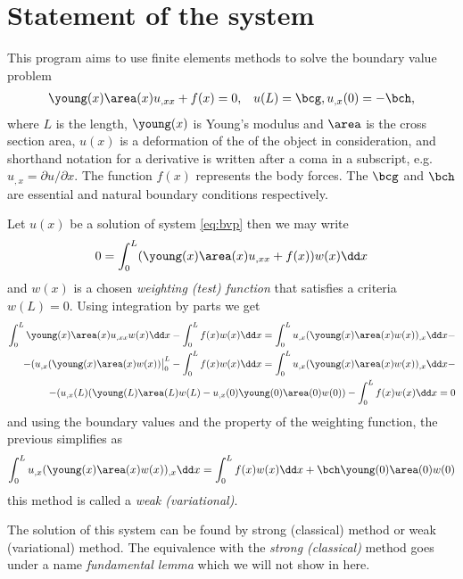 \documentclass[twoside,a4paper,12pt]{article}
\begin{document}
\section{Statement of the system}

This program aims to use finite elements methods to solve the boundary
value problem
%
\begin{align}
  \young(x) \area(x) u_{,xx} + f(x) = 0, \label{eq:bvp}
  &&u(L) = \bcg, u_{,x}(0) = -\bch,
\end{align}
where $L$ is the length, $\young(x)$ is Young's modulus and $\area$ is
the cross section area, $u(x)$ is a deformation of the of the object
in consideration, and shorthand notation for a derivative is written
after a coma in a subscript, e.g. $u_{,x} = \partial u /\partial x$.  The
function $f(x)$ represents the body forces. The $\bcg$ and $\bch$ are
essential and natural boundary conditions respectively.

Let $u(x)$ be a solution of system \eqref{eq:bvp} then we may write
%
\begin{align}
  0 = \int_0^L (\young(x) \area(x) u_{,xx} + f(x)) w(x) \dd x 
\end{align}
and $w(x)$ is a chosen \emph{weighting (test) function} that satisfies a
criteria $w(L)=0$.
%
Using integration by parts we get
%
\begin{align}
  \int_0^L \young(x) \area(x) u_{,xx} w(x) \dd x 
  -\int_0^L f(x) w(x) \dd x  =
   \int_0^L u_{,x} (\young(x) \area(x) w(x))_{,x} \dd x -\nonumber \\ -
  (u_{,x} (\young(x) \area(x)  w(x))\big|_0^L -
  \int_0^L f(x) w(x) \dd x =  
  \int_0^L u_{,x} (\young(x) \area(x) w(x))_{,x} \dd x -\nonumber \\ -
  (u_{,x}(L) (\young(L) \area(L)  w(L) -
  u_{,x}(0) \young(0) \area(0)  w(0)) 
  -\int_0^L f(x) w(x) \dd x = 0
\end{align}
%
and using the boundary values and the property of the weighting
function, the previous simplifies as
%
\begin{align}
  \int_0^L u_{,x} (\young(x) \area(x) w(x))_{,x} \dd x =  
  \int_0^L f(x) w(x) \dd x + \bch \young(0) \area(0)  w(0)
  \label{eq:weak-exact}
\end{align}
%
this method is called a \emph{weak (variational)}.

The solution of this system can be found by strong (classical) method
or weak (variational) method. The equivalence with the \emph{strong
  (classical)} method goes under a name \emph{fundamental lemma} which we will not show in here.
\end{document}
